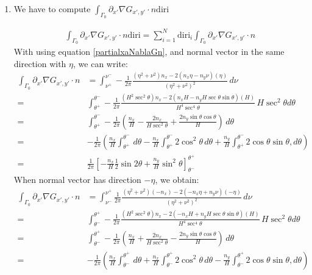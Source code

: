 \documentclass[a4paper,12pt]{article}
\newcommand{\integ}[3]{%
\ensuremath{\displaystyle{\int^{#2}_{#1} #3}}}
\begin{document}
\begin{enumerate}
\item We have to compute $\integ{\Gamma_0}{}{\partial_{x'}\nabla G_{x',y'} \cdot n \text{diri}}$

\begin{align}
  \integ{\Gamma_0}{}{\partial_{x'}\nabla G_{x',y'} \cdot n \text{diri}}=\sum\limits_{i=1}^N \text{diri}_i \integ{\Gamma_0}{}{\partial_{x'}\nabla G_{x',y'} \cdot n}
\end{align}
With using equation \ref{partialxaNablaGn}, and normal vector in the same direction with $\eta$, we can write:
\begin{align}
 \integ{\Gamma_0}{}{\partial_{x'}\nabla G_{x',y'} \cdot n}&=\integ{\nu^+}{\nu^-}{-\frac{1}{2\pi} \frac{(\eta^2+\nu^2)n_x-2(n_x\eta-n_y\nu)(\eta)}{(\eta^2+\nu^2)^2} \, d\nu}\\
 =& \integ{\theta^+}{\theta^-}{-\frac{1}{2\pi} \frac{(H^2 \sec^2\theta)n_x-2(n_x H-n_y H \sec \theta \sin \theta)(H)}{H^4 \sec^4\theta} \, H \sec^2\theta d\theta}\\
=&\integ{\theta^+}{\theta^-}{-\frac{1}{2\pi} \left( \frac{n_x}{H}-\frac{2n_x}{H \sec^2\theta}+\frac{2n_y \sin \theta \cos\theta}{H} \right) \, d\theta}\\
=&-\frac{1}{2\pi} \left(\frac{n_x}{H} \integ{\theta^+}{\theta^-}{\, d\theta}-
 \frac{n_x}{H} \integ{\theta^+}{\theta^-}{2\cos^2\theta \, d\theta}+
 \frac{n_y}{H} \integ{\theta^+}{\theta^-}{2\cos \theta \sin\theta, d\theta} \right)\\
=& \frac{1}{2\pi} \left[-\frac{n_x}{H}\frac{1}{2}\sin2\theta+\frac{n_y}{H}\sin^2\theta \right]_{\theta^-}^{\theta^+}\label{intPartialxaNablaGn}
\end{align}
When normal vector has direction $-\eta$, we obtain:
\begin{align}
 \integ{\Gamma_0}{}{\partial_{x'}\nabla G_{x',y'} \cdot n}&=\integ{\nu^-}{\nu^+}{\frac{1}{2\pi} \frac{(\eta^2+\nu^2)(-n_x)-2(-n_x\eta+n_y\nu)(-\eta)}{(\eta^2+\nu^2)^2} \, d\nu}\\
 =& \integ{\theta^-}{\theta^+}{-\frac{1}{2\pi} \frac{(H^2 \sec^2\theta)n_x-2(-n_x H+n_y H \sec \theta \sin \theta)(H)}{H^4 \sec^4\theta} \, H \sec^2\theta d\theta}\\
=&\integ{\theta^-}{\theta^+}{-\frac{1}{2\pi} \left( \frac{n_x}{H}+\frac{2n_x}{H \sec^2\theta}-\frac{2n_y \sin \theta \cos\theta}{H} \right) \, d\theta}\\
=&-\frac{1}{2\pi} \left(\frac{n_x}{H} \integ{\theta^-}{\theta^+}{\, d\theta}+
 \frac{n_x}{H} \integ{\theta^-}{\theta^+}{2\cos^2\theta \, d\theta}-
 \frac{n_y}{H} \integ{\theta^-}{\theta^+}{2\cos \theta \sin\theta, d\theta} \right)\\

\end{align}
\end{enumerate}
\end{document}
